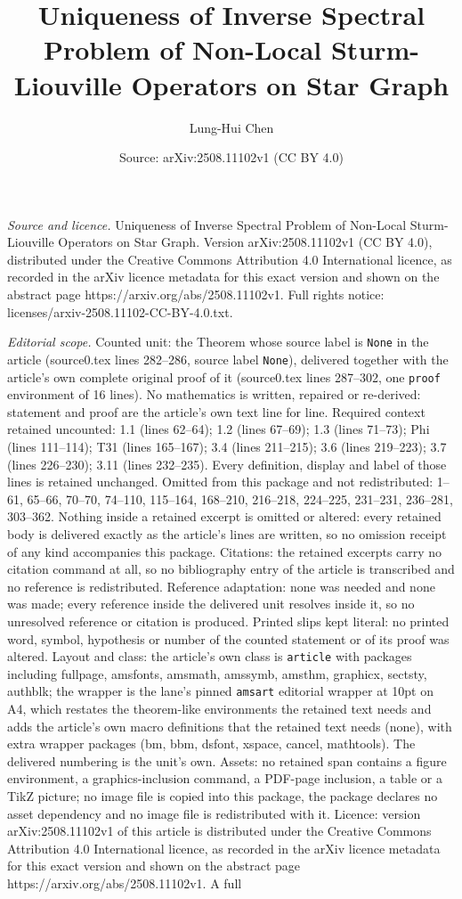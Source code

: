 \documentclass[10pt,a4paper]{amsart}
\title[Uniqueness of Inverse Spectral Problem of Non-Local Sturm-Li]{Uniqueness of Inverse Spectral Problem of Non-Local Sturm-Liouville Operators on Star Graph}
\author{Lung-Hui Chen}
\date{Source: arXiv:2508.11102v1 (CC BY 4.0)}
\begin{document}
\maketitle

\noindent\emph{Source and licence.} Uniqueness of Inverse Spectral Problem of Non-Local Sturm-Liouville Operators on Star Graph. Version arXiv:2508.11102v1 (CC BY 4.0), distributed under the Creative Commons Attribution 4.0 International licence, as recorded in the arXiv licence metadata for this exact version and shown on the abstract page https://arxiv.org/abs/2508.11102v1. Full rights notice: licenses/arxiv-2508.11102-CC-BY-4.0.txt.\par\smallskip

\noindent\textit{Editorial scope.} Counted unit: the Theorem whose source label is \texttt{None} in the article (source0.tex lines 282--286, source label \texttt{None}), delivered together with the article's own complete original proof of it (source0.tex lines 287--302, one \texttt{proof} environment of 16 lines). No mathematics is written, repaired or re-derived: statement and proof are the article's own text line for line. Required context retained uncounted: 1.1 (lines 62--64); 1.2 (lines 67--69); 1.3 (lines 71--73); Phi (lines 111--114); T31 (lines 165--167); 3.4 (lines 211--215); 3.6 (lines 219--223); 3.7 (lines 226--230); 3.11 (lines 232--235). Every definition, display and label of those lines is retained unchanged. Omitted from this package and not redistributed: 1--61, 65--66, 70--70, 74--110, 115--164, 168--210, 216--218, 224--225, 231--231, 236--281, 303--362. Nothing inside a retained excerpt is omitted or altered: every retained body is delivered exactly as the article's lines are written, so no omission receipt of any kind accompanies this package. Citations: the retained excerpts carry no citation command at all, so no bibliography entry of the article is transcribed and no reference is redistributed. Reference adaptation: none was needed and none was made; every reference inside the delivered unit resolves inside it, so no unresolved reference or citation is produced. Printed slips kept literal: no printed word, symbol, hypothesis or number of the counted statement or of its proof was altered. Layout and class: the article's own class is \texttt{article} with packages including fullpage, amsfonts, amsmath, amssymb, amsthm, graphicx, sectsty, authblk; the wrapper is the lane's pinned \texttt{amsart} editorial wrapper at 10pt on A4, which restates the theorem-like environments the retained text needs and adds the article's own macro definitions that the retained text needs (none), with extra wrapper packages (bm, bbm, dsfont, xspace, cancel, mathtools). The delivered numbering is the unit's own. Assets: no retained span contains a figure environment, a graphics-inclusion command, a PDF-page inclusion, a table or a TikZ picture; no image file is copied into this package, the package declares no asset dependency and no image file is redistributed with it. Licence: version arXiv:2508.11102v1 of this article is distributed under the Creative Commons Attribution 4.0 International licence, as recorded in the arXiv licence metadata for this exact version and shown on the abstract page https://arxiv.org/abs/2508.11102v1. A full 
\end{document}
